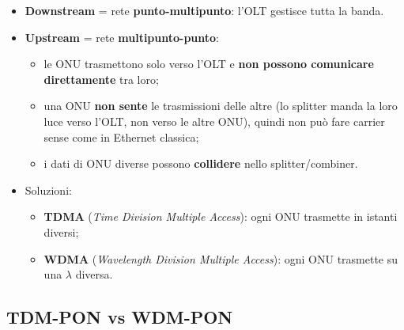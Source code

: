 \begin{itemize}
\tightlist
\item
  \textbf{Downstream} = rete \textbf{punto-multipunto}: l'OLT gestisce tutta la banda.
\item
  \textbf{Upstream} = rete \textbf{multipunto-punto}:

  \begin{itemize}
  \tightlist
  \item
    le ONU trasmettono solo verso l'OLT e \textbf{non possono comunicare direttamente} tra loro;
  \item
    una ONU \textbf{non sente} le trasmissioni delle altre (lo splitter manda la loro luce verso l'OLT, non verso le altre ONU), quindi non può fare carrier sense come in Ethernet classica;
  \item
    i dati di ONU diverse possono \textbf{collidere} nello splitter/combiner.
  \end{itemize}
\item
  Soluzioni:

  \begin{itemize}
  \tightlist
  \item
    \textbf{TDMA} (\emph{Time Division Multiple Access}): ogni ONU trasmette in istanti diversi;
  \item
    \textbf{WDMA} (\emph{Wavelength Division Multiple Access}): ogni ONU trasmette su una \(\lambda\) diversa.
  \end{itemize}
\end{itemize}

\subsection{TDM-PON vs WDM-PON}

